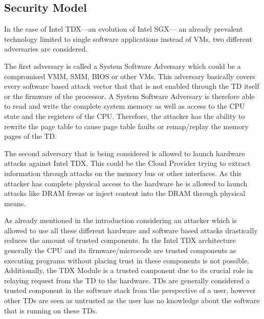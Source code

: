 \documentclass[sigplan,screen,nonacm]{acmart}
\begin{document}
\subsection{Security Model}
In the case of Intel TDX---an evolution of Intel SGX--- an already prevalent technology limited to single software applications instead of VMs, two different adversaries are considered.

The first adversary is called a System Software Adversary which could be a compromised VMM, SMM, BIOS or other VMs.
This adversary basically covers every software based attack vector that that is not enabled through the TD itself or the firmware of the processor\cite[p. 8]{Intel-TDX-Whitepaper}.
A System Software Adversary is therefore able to read and write the complete system memory as well as access to the CPU state and the registers of the CPU.
Therefore, the attacker has the ability to rewrite the page table to cause page table faults or remap/replay the memory pages of the TD.

The second adversary that is being considered is allowed to launch hardware attacks against Intel TDX.
This could be the Cloud Provider trying to extract information through attacks on the memory bus or other interfaces.
As this attacker has complete physical access to the hardware he is allowed to launch attacks like DRAM freeze or inject content into the DRAM through physical means\cite[p. 8]{Intel-TDX-Whitepaper}.

As already mentioned in the introduction considering an attacker which is allowed to use all these different hardware and software based attacks drastically reduces the amount of trusted components.
In the Intel TDX architecture generally the CPU and its firmware/microcode are trusted components as executing programs without placing trust in these components is not possible.
Additionally, the TDX Module is a trusted component due to its crucial role in relaying request from the TD to the hardware.
TDs are generally considered a trusted component in the software stack from the perspective of a user, however other TDs are seen as untrusted as the user has no knowledge about the software that is running on these TDs. 
\end{document}
